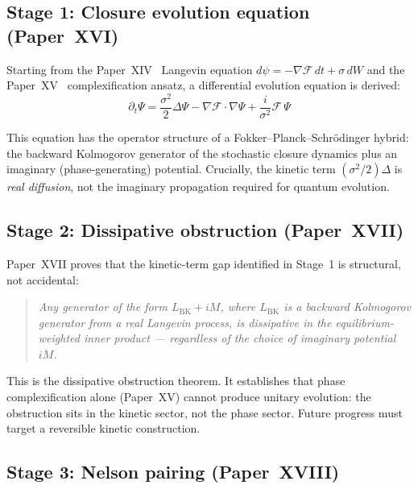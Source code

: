 \documentclass[12pt]{article}
\newcommand{\Fcal}{\mathcal{F}}
\begin{document}
\subsection{Stage 1: Closure evolution equation (Paper~XVI)}

Starting from the Paper~XIV~\citep{SmartXIV} Langevin equation $d\psi = -\nabla\Fcal\,dt + \sigma\,dW$ and the Paper~XV~\citep{SmartXV} complexification ansatz, a differential evolution equation is derived:
\begin{equation}\label{eq:XVI}
    \partial_t\Psi = \frac{\sigma^2}{2}\Delta\Psi - \nabla\Fcal\cdot\nabla\Psi + \frac{i}{\sigma^2}\Fcal\,\Psi
\end{equation}

This equation has the operator structure of a Fokker--Planck--Schr\"odinger hybrid: the backward Kolmogorov generator of the stochastic closure dynamics plus an imaginary (phase-generating) potential. Crucially, the kinetic term $(\sigma^2/2)\Delta$ is \textit{real diffusion}, not the imaginary propagation required for quantum evolution.

\subsection{Stage 2: Dissipative obstruction (Paper~XVII)}

Paper~XVII proves that the kinetic-term gap identified in Stage~1 is structural, not accidental:

\begin{quote}
\textit{Any generator of the form $L_{\mathrm{BK}} + iM$, where $L_{\mathrm{BK}}$ is a backward Kolmogorov generator from a real Langevin process, is dissipative in the equilibrium-weighted inner product --- regardless of the choice of imaginary potential $iM$.}
\end{quote}

This is the dissipative obstruction theorem. It establishes that phase complexification alone (Paper~XV) cannot produce unitary evolution: the obstruction sits in the kinetic sector, not the phase sector. Future progress must target a reversible kinetic construction.

\subsection{Stage 3: Nelson pairing (Paper~XVIII)}
\end{document}

